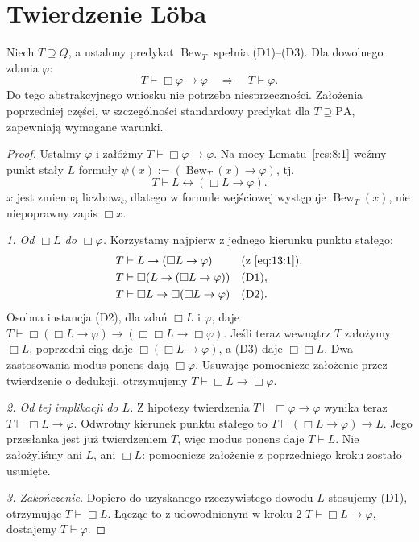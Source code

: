 \section{Twierdzenie Löba}\label{sec:loeb}
\begin{twierdzenie}[Löb]\label{res:13:1}
Niech $T\supseteq Q$, a ustalony predykat $\operatorname{Bew}_T$ spełnia (D1)--(D3). Dla dowolnego zdania $\varphi$:
\[
T\vdash\Box\varphi\to\varphi\quad\Longrightarrow\quad T\vdash\varphi.
\]
Do tego abstrakcyjnego wniosku nie potrzeba niesprzeczności. Założenia poprzedniej części, w szczególności standardowy predykat dla $T\supseteq\mathrm{PA}$, zapewniają wymagane warunki.
\end{twierdzenie}
\begin{proof}
Ustalmy $\varphi$ i załóżmy $T\vdash\Box\varphi\to\varphi$. Na mocy Lematu~\ref{res:8:1} weźmy punkt stały $L$ formuły $\psi(x):=(\operatorname{Bew}_T(x)\to\varphi)$, tj.
\begin{equation}\label{eq:13:1}
T\vdash L\leftrightarrow(\Box L\to\varphi).
\end{equation}
$x$ jest zmienną liczbową, dlatego w formule wejściowej występuje $\operatorname{Bew}_T(x)$, nie niepoprawny zapis $\Box x$.

\emph{1. Od $\Box L$ do $\Box\varphi$.} Korzystamy najpierw z jednego kierunku punktu stałego:
\begin{align*}
T&\vdash L\to(\Box L\to\varphi) &&\text{(z~\eqref{eq:13:1})},\\
T&\vdash\Box(L\to(\Box L\to\varphi)) &&\text{(D1)},\\
T&\vdash\Box L\to\Box(\Box L\to\varphi) &&\text{(D2)}.
\end{align*}
Osobna instancja (D2), dla zdań $\Box L$ i $\varphi$, daje $T\vdash\Box(\Box L\to\varphi)\to(\Box\Box L\to\Box\varphi)$. Jeśli teraz wewnątrz $T$ założymy $\Box L$, poprzedni ciąg daje $\Box(\Box L\to\varphi)$, a (D3) daje $\Box\Box L$. Dwa zastosowania modus ponens dają $\Box\varphi$. Usuwając pomocnicze założenie przez twierdzenie o dedukcji, otrzymujemy $T\vdash\Box L\to\Box\varphi$.

\emph{2. Od tej implikacji do $L$.} Z hipotezy twierdzenia $T\vdash\Box\varphi\to\varphi$ wynika teraz $T\vdash\Box L\to\varphi$. Odwrotny kierunek punktu stałego to $T\vdash(\Box L\to\varphi)\to L$. Jego przesłanka jest już twierdzeniem $T$, więc modus ponens daje $T\vdash L$. Nie założyliśmy ani $L$, ani $\Box L$: pomocnicze założenie z poprzedniego kroku zostało usunięte.

\emph{3. Zakończenie.} Dopiero do uzyskanego rzeczywistego dowodu $L$ stosujemy (D1), otrzymując $T\vdash\Box L$. Łącząc to z udowodnionym w kroku 2 $T\vdash\Box L\to\varphi$, dostajemy $T\vdash\varphi$.
\end{proof}

